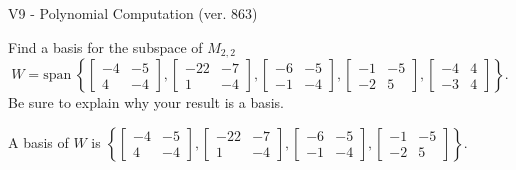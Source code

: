 \begin{exercise}
  \begin{exerciseTitle}V9 - Polynomial Computation (ver. 863)\end{exerciseTitle}
  \begin{exerciseStatement}
    Find a basis for the subspace of \(M_{2,2}\) 
\[W=\mathrm{span}\ \left\{\left[\begin{array}{cc}
-4 & -5 \\
4 & -4
\end{array}\right] , \left[\begin{array}{cc}
-22 & -7 \\
1 & -4
\end{array}\right] , \left[\begin{array}{cc}
-6 & -5 \\
-1 & -4
\end{array}\right] , \left[\begin{array}{cc}
-1 & -5 \\
-2 & 5
\end{array}\right] , \left[\begin{array}{cc}
-4 & 4 \\
-3 & 4
\end{array}\right]\right\}.\]
 Be sure to explain why your result is a basis.


  \end{exerciseStatement}
  \begin{exerciseAnswer}
   A basis of \(W\) is  \(\left\{\left[\begin{array}{cc}
-4 & -5 \\
4 & -4
\end{array}\right] , \left[\begin{array}{cc}
-22 & -7 \\
1 & -4
\end{array}\right] , \left[\begin{array}{cc}
-6 & -5 \\
-1 & -4
\end{array}\right] , \left[\begin{array}{cc}
-1 & -5 \\
-2 & 5
\end{array}\right]\right\}\).
  


  \end{exerciseAnswer}
\end{exercise}